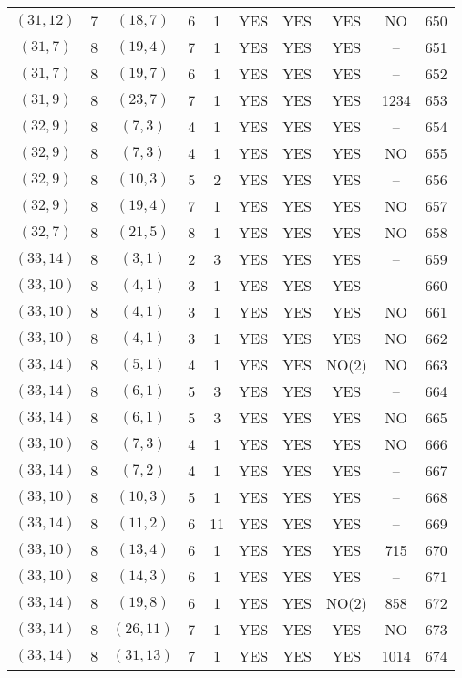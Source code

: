 \begin{longtable}{|c|c|c|c|c|c|c|c|c|c|}
$(31, 12)$ & 7 & $(18, 7)$ & 6 & 1 & YES & YES & YES & NO & 650\\
$(31, 7)$ & 8 & $(19, 4)$ & 7 & 1 & YES & YES & YES & -- & 651\\
$(31, 7)$ & 8 & $(19, 7)$ & 6 & 1 & YES & YES & YES & -- & 652\\
$(31, 9)$ & 8 & $(23, 7)$ & 7 & 1 & YES & YES & YES & 1234 & 653\\
$(32, 9)$ & 8 & $(7, 3)$ & 4 & 1 & YES & YES & YES & -- & 654\\
$(32, 9)$ & 8 & $(7, 3)$ & 4 & 1 & YES & YES & YES & NO & 655\\
$(32, 9)$ & 8 & $(10, 3)$ & 5 & 2 & YES & YES & YES & -- & 656\\
$(32, 9)$ & 8 & $(19, 4)$ & 7 & 1 & YES & YES & YES & NO & 657\\
$(32, 7)$ & 8 & $(21, 5)$ & 8 & 1 & YES & YES & YES & NO & 658\\
$(33, 14)$ & 8 & $(3, 1)$ & 2 & 3 & YES & YES & YES & -- & 659\\
$(33, 10)$ & 8 & $(4, 1)$ & 3 & 1 & YES & YES & YES & -- & 660\\
$(33, 10)$ & 8 & $(4, 1)$ & 3 & 1 & YES & YES & YES & NO & 661\\
$(33, 10)$ & 8 & $(4, 1)$ & 3 & 1 & YES & YES & YES & NO & 662\\
$(33, 14)$ & 8 & $(5, 1)$ & 4 & 1 & YES & YES & NO(2) & NO & 663\\
$(33, 14)$ & 8 & $(6, 1)$ & 5 & 3 & YES & YES & YES & -- & 664\\
$(33, 14)$ & 8 & $(6, 1)$ & 5 & 3 & YES & YES & YES & NO & 665\\
$(33, 10)$ & 8 & $(7, 3)$ & 4 & 1 & YES & YES & YES & NO & 666\\
$(33, 14)$ & 8 & $(7, 2)$ & 4 & 1 & YES & YES & YES & -- & 667\\
$(33, 10)$ & 8 & $(10, 3)$ & 5 & 1 & YES & YES & YES & -- & 668\\
$(33, 14)$ & 8 & $(11, 2)$ & 6 & 11 & YES & YES & YES & -- & 669\\
$(33, 10)$ & 8 & $(13, 4)$ & 6 & 1 & YES & YES & YES & 715 & 670\\
$(33, 10)$ & 8 & $(14, 3)$ & 6 & 1 & YES & YES & YES & -- & 671\\
$(33, 14)$ & 8 & $(19, 8)$ & 6 & 1 & YES & YES & NO(2) & 858 & 672\\
$(33, 14)$ & 8 & $(26, 11)$ & 7 & 1 & YES & YES & YES & NO & 673\\
$(33, 14)$ & 8 & $(31, 13)$ & 7 & 1 & YES & YES & YES & 1014 & 674\\

\end{longtable}
